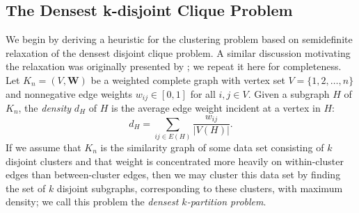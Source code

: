 \documentclass[twoside,11pt]{article}
\newcommand{\bs}{\boldsymbol}
\newcommand{\W}{\bs {W}}
\newcommand{\0}{\bs{0}}
\begin{document}
\subsection{The Densest k-disjoint Clique Problem}
\label{sec: kdc}
We begin by deriving a heuristic for the clustering problem based on semidefinite relaxation
of the densest disjoint clique problem.
A similar discussion motivating the relaxation was originally presented by \cite{ames2014guaranteed}; we repeat it here for completeness.
Let $K_n=(V, \W)$ be a weighted complete graph with vertex set
$V=\{1,2,\dots,n\}$ and nonnegative edge weights $w_{ij} \in [0,1]$ for all $i,j \in V$.
Given a subgraph \(H\) of \(K_n\), the \emph{density} \(d_H\) of \(H\)
is the average edge weight incident at a vertex in \(H\):
\[
d_H = \sum_{ij \in E(H)} \frac{w_{ij}}{|V(H)|}.
\]
If we assume that \(K_n\) is the similarity graph of some data set consisting
of \(k\) disjoint clusters and that weight
is concentrated more heavily on within-cluster edges than between-cluster
edges, then we may cluster this data set by finding the set of \(k\) disjoint
subgraphs, corresponding to these clusters, with maximum density;
we call this problem the \emph{densest \(k\)-partition problem}.
\end{document}
